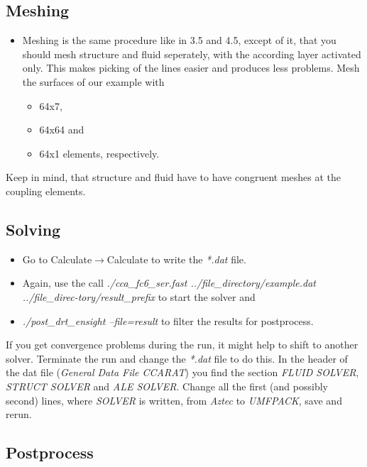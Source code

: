 \subsection{Meshing}

\begin{itemize}
\item Meshing is the same procedure like in 3.5 and 4.5, except of it, that
you should mesh structure and fluid seperately, with the according
layer activated only. This makes picking of the lines easier and produces
less problems. Mesh the surfaces of our example with 

\begin{itemize}
\item 64x7, 
\item 64x64 and 
\item 64x1 elements, respectively.
\end{itemize}
\end{itemize}
Keep in mind, that structure and fluid have to have congruent meshes
at the coupling elements. 


\subsection{Solving}

\begin{itemize}
\item Go to Calculate\emph{$\to$}Calculate to write the \emph{{*}.dat}
file. 
\item Again, use the call \emph{./cca\_fc6\_ser.fast ../file\_directory/example.dat
../file\_direc-tory/result\_prefix} to start the solver and
\item \emph{./post\_drt\_ensight --file=result} to filter the results for
postprocess.
\end{itemize}
If you get convergence problems during the run, it might help to shift
to another solver. Terminate the run and change the \emph{{*}.dat}
file to do this. In the header of the dat file (\emph{General Data
File CCARAT}) you find the section \emph{FLUID SOLVER}, \emph{STRUCT
SOLVER} and \emph{ALE SOLVER}. Change all the first (and possibly
second) lines, where \emph{SOLVER} is written, from \emph{Aztec} to
\emph{UMFPACK}, save and rerun.


\subsection{Postprocess}

